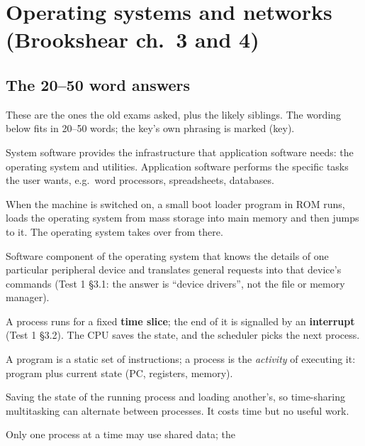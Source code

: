 \documentclass{fkt-notes}
\begin{document}
\newpage
\section{Operating systems and networks (Brookshear ch.~3 and 4)}

\subsection{The 20--50 word answers}
These are the ones the old exams asked, plus the likely siblings. The wording below fits in
20--50 words; the key's own phrasing is marked (key).
\begin{description}[leftmargin=0pt,labelindent=0pt,itemsep=3pt]
  \item[Application vs.\ system software (key).] System software provides the infrastructure that
        application software needs: the operating system and utilities. Application software
        performs the specific tasks the user wants, e.g.\ word processors, spreadsheets, databases.
  \item[Bootstrap (key).] When the machine is switched on, a small boot loader program in ROM runs,
        loads the operating system from mass storage into main memory and then jumps to it.
        The operating system takes over from there.
  \item[Device driver.] Software component of the operating system that knows the details of one
        particular peripheral device and translates general requests into that device's commands
        (Test 1 \S3.1: the answer is ``device drivers'', not the file or memory manager).
  \item[Interrupt and time slice.] A process runs for a fixed \textbf{time slice}; the end of it is
        signalled by an \textbf{interrupt} (Test 1 \S3.2). The CPU saves the state, and the scheduler picks
        the next process.
  \item[Process vs.\ program.] A program is a static set of instructions; a process is the
        \emph{activity} of executing it: program plus current state (PC, registers, memory).
  \item[Context switch.] Saving the state of the running process and loading another's, so
        time-sharing multitasking can alternate between processes. It costs time but no useful work.
  \item[Mutual exclusion / critical region.] Only one process at a time may use shared data; the

\end{description}
\end{document}
